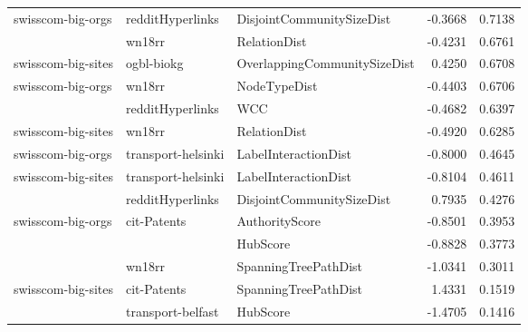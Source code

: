 \begin{table}[ht!]
\begin{adjustbox}{width=0.8\columnwidth}
\begin{tabular}{lllrr}
swisscom-big-orgs & redditHyperlinks & DisjointCommunitySizeDist & -0.3668 &       0.7138 \\
                   & wn18rr & RelationDist & -0.4231 &       0.6761 \\
swisscom-big-sites & ogbl-biokg & OverlappingCommunitySizeDist &  0.4250 &       0.6708 \\
swisscom-big-orgs & wn18rr & NodeTypeDist & -0.4403 &       0.6706 \\
                   & redditHyperlinks & WCC & -0.4682 &       0.6397 \\
swisscom-big-sites & wn18rr & RelationDist & -0.4920 &       0.6285 \\
swisscom-big-orgs & transport-helsinki & LabelInteractionDist & -0.8000 &       0.4645 \\
swisscom-big-sites & transport-helsinki & LabelInteractionDist & -0.8104 &       0.4611 \\
                   & redditHyperlinks & DisjointCommunitySizeDist &  0.7935 &       0.4276 \\
swisscom-big-orgs & cit-Patents & AuthorityScore & -0.8501 &       0.3953 \\
                   &                   & HubScore & -0.8828 &       0.3773 \\
                   & wn18rr & SpanningTreePathDist & -1.0341 &       0.3011 \\
swisscom-big-sites & cit-Patents & SpanningTreePathDist &  1.4331 &       0.1519 \\
                   & transport-belfast & HubScore & -1.4705 &       0.1416 \\
\bottomrule
\end{tabular}
\end{adjustbox}
\end{table}

